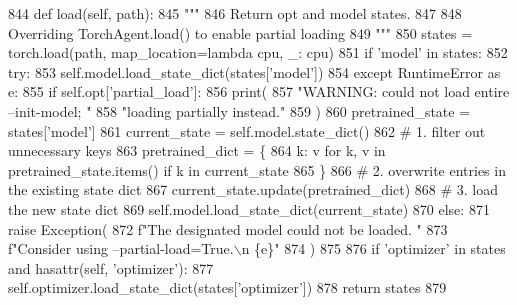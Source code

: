 \begin{DoxyCode}
844     \textcolor{keyword}{def }load(self, path):
845         \textcolor{stringliteral}{"""}
846 \textcolor{stringliteral}{        Return opt and model states.}
847 \textcolor{stringliteral}{}
848 \textcolor{stringliteral}{        Overriding TorchAgent.load() to enable partial loading}
849 \textcolor{stringliteral}{        """}
850         states = torch.load(path, map\_location=\textcolor{keyword}{lambda} cpu, \_: cpu)
851         \textcolor{keywordflow}{if} \textcolor{stringliteral}{'model'} \textcolor{keywordflow}{in} states:
852             \textcolor{keywordflow}{try}:
853                 self.model.load\_state\_dict(states[\textcolor{stringliteral}{'model'}])
854             \textcolor{keywordflow}{except} RuntimeError \textcolor{keyword}{as} e:
855                 \textcolor{keywordflow}{if} self.opt[\textcolor{stringliteral}{'partial\_load'}]:
856                     print(
857                         \textcolor{stringliteral}{"WARNING: could not load entire --init-model; "}
858                         \textcolor{stringliteral}{"loading partially instead."}
859                     )
860                     pretrained\_state = states[\textcolor{stringliteral}{'model'}]
861                     current\_state = self.model.state\_dict()
862                     \textcolor{comment}{# 1. filter out unnecessary keys}
863                     pretrained\_dict = \{
864                         k: v \textcolor{keywordflow}{for} k, v \textcolor{keywordflow}{in} pretrained\_state.items() \textcolor{keywordflow}{if} k \textcolor{keywordflow}{in} current\_state
865                     \}
866                     \textcolor{comment}{# 2. overwrite entries in the existing state dict}
867                     current\_state.update(pretrained\_dict)
868                     \textcolor{comment}{# 3. load the new state dict}
869                     self.model.load\_state\_dict(current\_state)
870                 \textcolor{keywordflow}{else}:
871                     \textcolor{keywordflow}{raise} Exception(
872                         f\textcolor{stringliteral}{"The designated model could not be loaded. "}
873                         f\textcolor{stringliteral}{"Consider using --partial-load=True.\(\backslash\)n \{e\}"}
874                     )
875 
876         \textcolor{keywordflow}{if} \textcolor{stringliteral}{'optimizer'} \textcolor{keywordflow}{in} states \textcolor{keywordflow}{and} hasattr(self, \textcolor{stringliteral}{'optimizer'}):
877             self.optimizer.load\_state\_dict(states[\textcolor{stringliteral}{'optimizer'}])
878         \textcolor{keywordflow}{return} states
879 
\end{DoxyCode}

